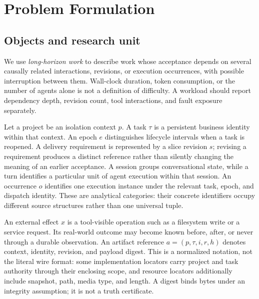 \section{Problem Formulation}\label{sec:model}
\subsection{Objects and research unit}
We use \emph{long-horizon work} to describe work whose acceptance depends on several causally related interactions, revisions, or execution occurrences, with possible interruption between them. Wall-clock duration, token consumption, or the number of agents alone is not a definition of difficulty. A workload should report dependency depth, revision count, tool interactions, and fault exposure separately.

Let a project be an isolation context $p$. A task $\tau$ is a persistent business identity within that context. An epoch $e$ distinguishes lifecycle intervals when a task is reopened. A delivery requirement is represented by a slice revision $s$; revising a requirement produces a distinct reference rather than silently changing the meaning of an earlier acceptance. A session groups conversational state, while a turn identifies a particular unit of agent execution within that session. An occurrence $o$ identifies one execution instance under the relevant task, epoch, and dispatch identity. These are analytical categories: their concrete identifiers occupy different source structures rather than one universal tuple.

An external effect $x$ is a tool-visible operation such as a filesystem write or a service request. Its real-world outcome may become known before, after, or never through a durable observation. An artifact reference $a=(p,\tau,i,r,h)$ denotes context, identity, revision, and payload digest. This is a normalized notation, not the literal wire format: some implementation locators carry project and task authority through their enclosing scope, and resource locators additionally include snapshot, path, media type, and length. A digest binds bytes under an integrity assumption; it is not a truth certificate.

